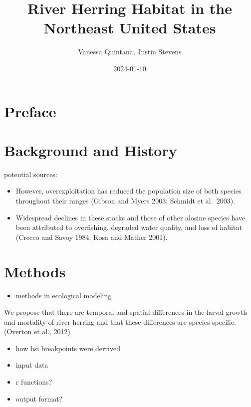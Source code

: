 \documentclass[
]{book}
\title{River Herring Habitat in the Northeast United States}
\author{Vanessa Quintana, Justin Stevens}
\date{2024-01-10}
\providecommand{\tightlist}{%
  \setlength{\itemsep}{0pt}\setlength{\parskip}{0pt}}
\begin{document}
\maketitle

{
\setcounter{tocdepth}{1}
\tableofcontents
}
\hypertarget{preface}{%
\chapter{Preface}\label{preface}}

\hypertarget{background-and-history}{%
\chapter{Background and History}\label{background-and-history}}

potential sources:

\begin{itemize}
\item
  However, overexploitation has reduced the population size of both species throughout their ranges (Gibson and Myers 2003; Schmidt et al.~2003).
\item
  Widespread declines in these stocks and those of other alosine species have been attributed to overfishing, degraded water quality, and loss of habitat (Crecco and Savoy 1984; Kosa and Mather 2001).
\end{itemize}

\hypertarget{cross}{%
\chapter{Methods}\label{cross}}

\begin{itemize}
\tightlist
\item
  methods in ecological modeling
\end{itemize}

We propose that there are temporal and spatial differences in the larval growth and mortality of river herring and that these differences are species specific. (Overton et al., 2012)

\begin{itemize}
\item
  how hsi breakpoints were derrived
\item
  input data
\item
  r functions?
\item
  output format?
\end{itemize}
\end{document}
